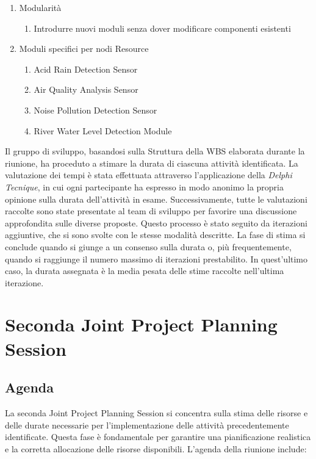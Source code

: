 \begin{enumerate}
    \item Modularità
          \begin{enumerate}
              \item Introdurre nuovi moduli senza dover modificare componenti esistenti
          \end{enumerate}
    \item Moduli specifici per nodi Resource
          \begin{enumerate}
              \item Acid Rain Detection Sensor
              \item Air Quality Analysis Sensor
              \item Noise Pollution Detection Sensor
              \item River Water Level Detection Module
          \end{enumerate}
\end{enumerate}

Il gruppo di sviluppo, basandosi sulla Struttura della WBS elaborata durante la riunione, ha proceduto a stimare la durata di ciascuna attività identificata. La valutazione dei tempi è stata effettuata attraverso l'applicazione della \textit{Delphi Tecnique}, in cui ogni partecipante ha espresso in modo anonimo la propria opinione sulla durata dell'attività in esame. Successivamente, tutte le valutazioni raccolte sono state presentate al team di sviluppo per favorire una discussione approfondita sulle diverse proposte. Questo processo è stato seguito da iterazioni aggiuntive, che si sono svolte con le stesse modalità descritte. La fase di stima si conclude quando si giunge a un consenso sulla durata o, più frequentemente, quando si raggiunge il numero massimo di iterazioni prestabilito. In quest'ultimo caso, la durata assegnata è la media pesata delle stime raccolte nell'ultima iterazione.

\section{Seconda Joint Project Planning Session}

\subsection{Agenda}

La seconda Joint Project Planning Session si concentra sulla stima delle risorse e delle durate necessarie per l'implementazione delle attività precedentemente identificate. Questa fase è fondamentale per garantire una pianificazione realistica e la corretta allocazione delle risorse disponibili. L'agenda della riunione include:

